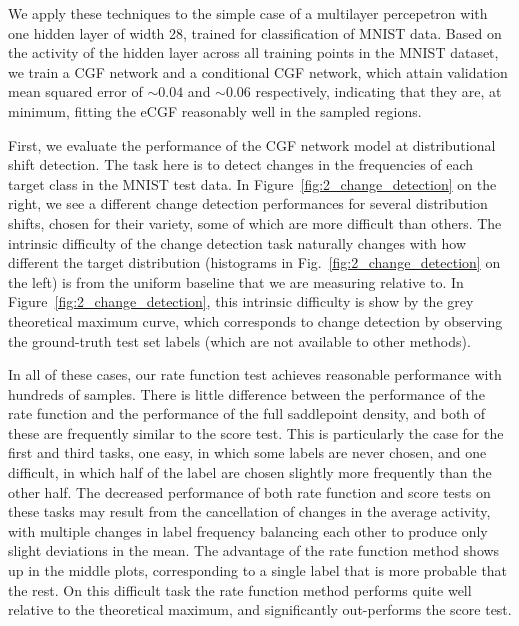 \documentclass{article}      %
\begin{document}
We apply these techniques to the simple case of a multilayer percepetron with one hidden layer of width 28, trained for classification of MNIST data.
Based on the activity of the hidden layer across all training points in the MNIST dataset, we train a CGF network and a conditional CGF network, which attain validation mean squared error of $\sim 0.04$ and $\sim 0.06$ respectively, indicating that they are, at minimum, fitting the eCGF reasonably well in the sampled regions.

First, we evaluate the performance of the CGF network model at distributional shift detection.
The task here is to detect changes in the frequencies of each target class in the MNIST test data. 
In Figure~\ref{fig:2_change_detection} on the right, we see a different change detection performances for several distribution shifts, chosen for their variety, some of which are more difficult than others.
The intrinsic difficulty of the change detection task naturally changes with how different the target distribution (histograms in Fig.~\ref{fig:2_change_detection} on the left) is from the uniform baseline that we are measuring relative to.
In Figure~\ref{fig:2_change_detection}, this intrinsic difficulty is show by the grey theoretical maximum curve, which corresponds to change detection by observing the ground-truth test set labels (which are not available to other methods).

In all of these cases, our rate function test achieves reasonable performance with hundreds of samples.
There is little difference between the performance of the rate function and the performance of the full saddlepoint density, and both of these are frequently similar to the score test.
This is particularly the case for the first and third tasks, one easy, in which some labels are never chosen, and one difficult, in which half of the label are chosen slightly more frequently than the other half.
The decreased performance of both rate function and score tests on these tasks may result from the cancellation of changes in the average activity, with multiple changes in label frequency balancing each other to produce only slight deviations in the mean.
The advantage of the rate function method shows up in the middle plots, corresponding to a single label that is more probable that the rest.
On this difficult task the rate function method performs quite well relative to the theoretical maximum, and significantly out-performs the score test.
\end{document}
